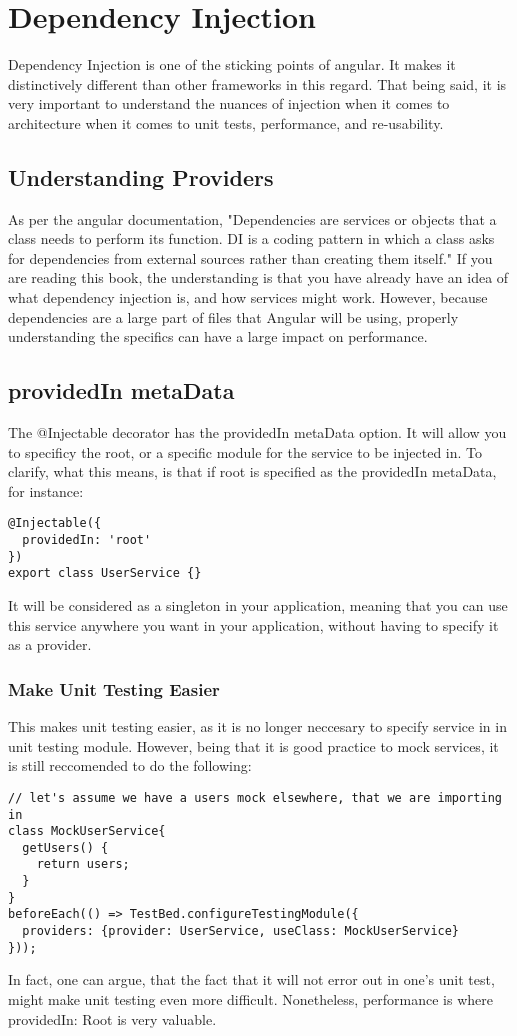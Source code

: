 \maketitle{}
\section{ Dependency Injection }

Dependency Injection is one of the sticking points of angular. It makes it
distinctively different than other frameworks in this regard. That being said,
it is very important to understand the nuances of injection when it comes to
architecture when it comes to unit tests, performance, and re-usability.

\subsection{ Understanding Providers }
As per the angular documentation, "Dependencies are services or objects that a
class needs to perform its function. DI is a coding pattern in which a class
asks for dependencies from external sources rather than creating them itself."
If you are reading this book, the understanding is that you have already have
an idea of what dependency injection is, and how services might work. However,
because dependencies are a large part of files that Angular will be using,
properly understanding the specifics can have a large impact on performance.

\subsection{ providedIn metaData }
The @Injectable decorator has the providedIn metaData option. It will allow you
to specificy the root, or a specific module for the service to be injected in.
To clarify, what this means, is that if root is specified as the providedIn
metaData, for instance:
\begin{verbatim}
@Injectable({
  providedIn: 'root'
})
export class UserService {}
\end{verbatim}

It will be considered as a singleton in your application, meaning that you can
use this service anywhere you want in your application, without having to
specify it as a provider.
\subsubsection{Make Unit Testing Easier}
This makes unit testing easier, as it is no longer neccesary to specify
service in in unit testing module. However, being that it is good practice
to mock services, it is still reccomended to do the following:
\begin{lstlisting}
// let's assume we have a users mock elsewhere, that we are importing in
class MockUserService{
  getUsers() {
    return users;
  }
}
beforeEach(() => TestBed.configureTestingModule({
  providers: {provider: UserService, useClass: MockUserService}
}));
\end{lstlisting}

In fact, one can argue, that the fact that it will not error out in one's unit
test, might make unit testing even more difficult. Nonetheless, performance is
where providedIn: Root is very valuable. 
